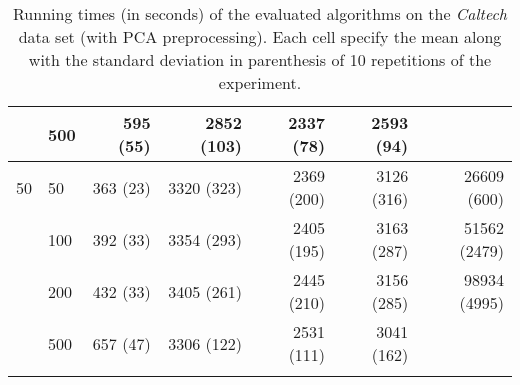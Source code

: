 \begin{longtable}{llrrrrr}
   & 500 &  595 (55) &     2852 (103) &   2337 (78) &            2593 (94) &  \\
 \midrule
50 & 50  &  363 (23) &     3320 (323) &  2369 (200) &           3126 (316) &   26609 (600) \\
   & 100 &  392 (33) &     3354 (293) &  2405 (195) &           3163 (287) &  51562 (2479) \\
   & 200 &  432 (33) &     3405 (261) &  2445 (210) &           3156 (285) &  98934 (4995) \\
   & 500 &  657 (47) &     3306 (122) &  2531 (111) &           3041 (162) &            \\
\bottomrule
\caption{Running times (in seconds) of the evaluated algorithms on the \textit{Caltech} data set (with PCA preprocessing). Each cell specify the mean along with the standard deviation in parenthesis of 10 repetitions of the experiment.}
\label{tab:running-time-mean-caltech-pca}
\end{longtable}

